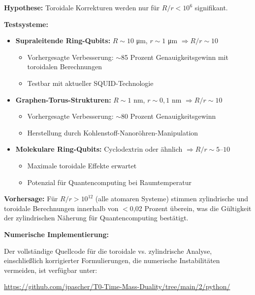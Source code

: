 \begin{experimentbox}
	\textbf{Hypothese:} Toroidale Korrekturen werden nur für $R/r < 10^6$ signifikant.
	
	\textbf{Testsysteme:}
	\begin{itemize}
		\item \textbf{Supraleitende Ring-Qubits:} $R \sim 10$ μm, $r \sim 1$ μm $\Rightarrow R/r \sim 10$
		\begin{itemize}
			\item Vorhergesagte Verbesserung: $\sim$85 Prozent Genauigkeitsgewinn mit toroidalen Berechnungen
			\item Testbar mit aktueller SQUID-Technologie
		\end{itemize}
		
		\item \textbf{Graphen-Torus-Strukturen:} $R \sim 1$ nm, $r \sim 0,\!1$ nm $\Rightarrow R/r \sim 10$
		\begin{itemize}
			\item Vorhergesagte Verbesserung: $\sim$80 Prozent Genauigkeitsgewinn
			\item Herstellung durch Kohlenstoff-Nanoröhren-Manipulation
		\end{itemize}
		
		\item \textbf{Molekulare Ring-Qubits:} Cyclodextrin oder ähnlich $\Rightarrow R/r \sim 5$--$10$
		\begin{itemize}
			\item Maximale toroidale Effekte erwartet
			\item Potenzial für Quantencomputing bei Raumtemperatur
		\end{itemize}
	\end{itemize}
	
	\textbf{Vorhersage:} Für $R/r > 10^{12}$ (alle atomaren Systeme) stimmen zylindrische 
	und toroidale Berechnungen innerhalb von $<$0,02 Prozent überein, was die Gültigkeit der 
	zylindrischen Näherung für Quantencomputing bestätigt.
\end{experimentbox}

\textbf{Numerische Implementierung:}

Der vollständige Quellcode für die toroidale vs. zylindrische Analyse, einschließlich 
korrigierter Formulierungen, die numerische Instabilitäten vermeiden, ist verfügbar unter:

\begin{center}
	\url{https://github.com/jpascher/T0-Time-Mass-Duality/tree/main/2/python/}
\end{center}

